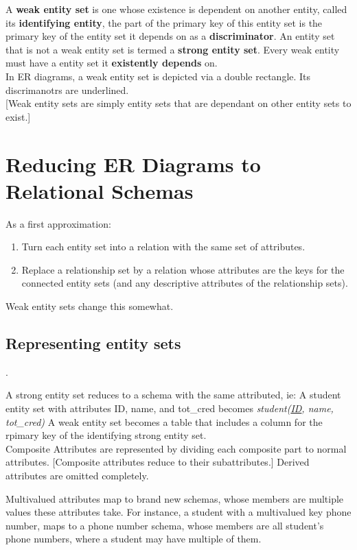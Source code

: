 \documentclass[11pt,a4paper,twocolumn]{book}
\begin{document}
A \textbf{weak entity set} is one whose existence is dependent on another entity, called its \textbf{identifying entity}, the part of the primary key of this entity set is the primary key of the entity set it depends on as a \textbf{discriminator}. An entity set that is not a weak entity set is termed a \textbf{strong entity set}. Every weak entity must have a entity set it \textbf{existently depends} on.\\

In ER diagrams, a weak entity set is depicted via a double rectangle. Its discrimanotrs are underlined.\\

[Weak entity sets are simply entity sets that are dependant on other entity sets to exist.]

\section{Reducing ER Diagrams to Relational Schemas}

As a first approximation:

\begin{enumerate}
\item Turn each entity set into a relation with the same set of attributes.
\item Replace a relationship set by a relation whose attributes are the keys for the connected entity sets (and any descriptive attributes of the relationship sets).
\end{enumerate}

Weak entity sets change this somewhat.

\subsection{Representing entity sets}.

A strong entity set reduces to a schema with the same attributed, ie: A student entity set with attributes ID, name, and tot\_cred becomes \textit{student(\underline{ID}, name, tot\_cred)} A weak entity set becomes a table that includes a column for the rpimary key of the identifying strong entity set.\\

Composite Attributes are represented by dividing each composite part to normal attributes. [Composite attributes reduce to their subattributes.] Derived attributes are omitted completely.

Multivalued attributes map to brand new schemas, whose members are multiple values these attributes take. For instance, a student with a multivalued key phone number, maps to a phone number schema, whose members are all student's phone numbers, where a student may have multiple of them.\\
\end{document}
